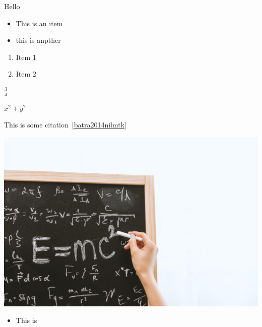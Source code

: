 \documentclass{article}
\begin{document}
Hello

\begin{itemize}
    \item This is an item
    \item this is anpther 
\end{itemize}

\begin{enumerate}
    \item Item 1
    \item Item 2
    
\end{enumerate}

$\frac{3}{4}$


$x^2+y^2$

This is some citation~\ref{batra2014nilmtk}



\includegraphics{images/maths}



\begin{itemize}
    \item This is
\end{itemize}
\end{document}
